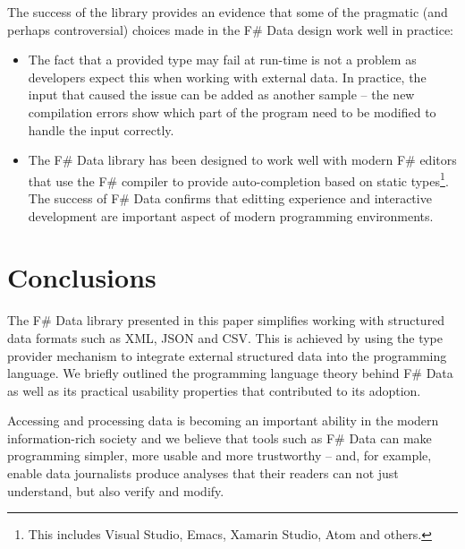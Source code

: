 \documentclass[preprint]{sigplanconf}
\begin{document}
The success of the library provides an evidence that some of the pragmatic (and perhaps
controversial) choices made in the F\# Data design work well in practice:

\begin{itemize}
\item The fact that a provided type may fail at run-time is not a problem as developers expect this
  when working with external data. In practice, the input that caused the issue can be added as
  another sample -- the new compilation errors show which part of the program need to be modified
  to handle the input correctly.

\item The F\# Data library has been designed to work well with modern F\# editors that use the
  F\# compiler to provide auto-completion based on static types\footnote{This includes Visual
  Studio, Emacs, Xamarin Studio, Atom and others.}. The success of F\# Data confirms that editting
  experience and interactive development are important aspect of modern programming environments.
\end{itemize}



\section{Conclusions}

The F\# Data library presented in this paper simplifies working with structured data formats such
as XML, JSON and CSV. This is achieved by using the type provider mechanism to integrate external
structured data into the programming language. We briefly outlined the programming language theory
behind F\# Data as well as its practical usability properties that contributed to its adoption.

Accessing and processing data is becoming an important ability in the modern information-rich
society and we believe that tools such as F\# Data can make programming simpler, more usable
and more trustworthy -- and, for example, enable data journalists produce analyses that their
readers can not just understand, but also verify and modify.



\end{document}
